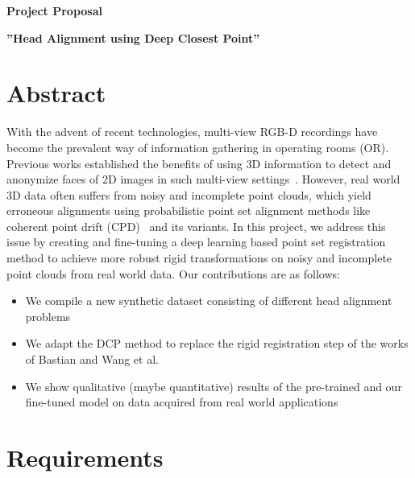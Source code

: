 \documentclass[a4paper,pagesize 10pt]{scrartcl}
\begin{document}
\begin{center}{\Huge\textbf{Project Proposal}}\end{center}
\begin{center}{\Large\textbf{''Head Alignment using Deep Closest Point''}}\end{center}

\section{Abstract}


With the advent of recent technologies, multi-view RGB-D recordings have become the prevalent way of information gathering in operating rooms (OR).
Previous works established the benefits of using 3D information to detect and anonymize faces of 2D images in such multi-view settings~\cite{disguisor}.
However, real world 3D data often suffers from noisy and incomplete point clouds, which yield erroneous alignments using probabilistic point set alignment methods like coherent point drift (CPD)~\cite{cpd} and its variants.
In this project, we address this issue by creating and fine-tuning a deep learning based point set registration method to achieve more robust rigid transformations on noisy and incomplete point clouds from real world data.
Our contributions are as follows:
 
\begin{itemize}
\itemsep0em
	\item We compile a new synthetic dataset consisting of different head alignment problems
	\item We adapt the DCP method to replace the rigid registration step of the works of Bastian and Wang et al.~\cite{disguisor}
	\item We show qualitative (maybe quantitative) results of the pre-trained and our fine-tuned model on data acquired from real world applications
\end{itemize}


\section{Requirements}
\end{document}
